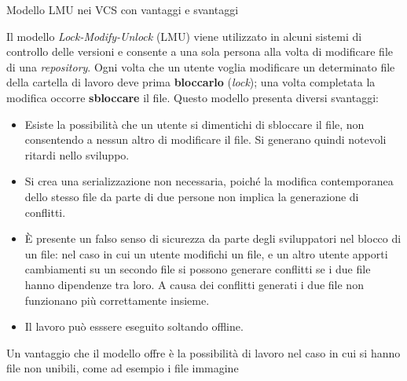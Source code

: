 \begin{problem}{1.24}
Modello LMU nei VCS con vantaggi e svantaggi
\end{problem}
\begin{solution}
Il modello \textit{Lock-Modify-Unlock} (LMU) viene utilizzato in alcuni sistemi di controllo delle versioni e consente a una sola persona alla volta di modificare file di una \textit{repository}.
Ogni volta che un utente voglia modificare un determinato file della cartella di lavoro deve prima \textbf{bloccarlo} (\textit{lock}); una volta completata la modifica occorre \textbf{sbloccare} il file.
Questo modello presenta diversi svantaggi:
\begin{itemize}
	\item Esiste la possibilità che un utente si dimentichi di sbloccare il file, non consentendo a nessun altro di modificare il file.
	\newline
	Si generano quindi notevoli ritardi nello sviluppo.
	\item Si crea una serializzazione non necessaria, poiché la modifica contemporanea dello stesso file da parte di due persone non implica la generazione di conflitti.
	\item È presente un falso senso di sicurezza da parte degli sviluppatori nel blocco di un file: nel caso in cui un utente modifichi un file, e un altro utente apporti cambiamenti su un secondo file si possono generare conflitti se i due file hanno dipendenze tra loro.
	\newline
	A causa dei conflitti generati i due file non funzionano più correttamente insieme.
	\item Il lavoro può esssere eseguito soltando offline.
\end{itemize}
Un vantaggio che il modello offre è la possibilità di lavoro nel caso in cui si hanno file non unibili, come ad esempio i file immagine
\end{solution}


